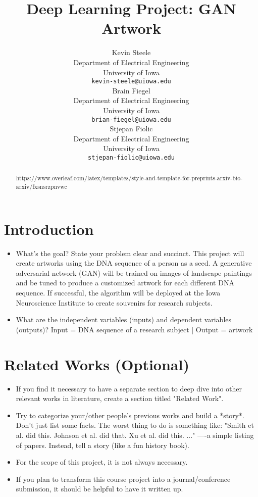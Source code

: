 \documentclass{article}
\title{Deep Learning Project: GAN Artwork}
\author{
	Kevin Steele \\
	Department of Electrical Engineering \\
	University of Iowa\\
	\texttt{kevin-steele@uiowa.edu} \\
	\And
	Brain Fiegel \\
	Department of Electrical Engineering \\
	University of Iowa\\
	\texttt{brian-fiegel@uiowa.edu} \\
	\And
	Stjepan Fiolic \\
	Department of Electrical Engineering \\
	University of Iowa\\
	\texttt{stjepan-fiolic@uiowa.edu} \\
}
\begin{document}
	\maketitle
	
	\begin{abstract}
		https://www.overleaf.com/latex/templates/style-and-template-for-preprints-arxiv-bio-arxiv/fxsnsrzpnvwc

	\end{abstract}
	
	
	
	
	\section{Introduction}
	\begin{itemize}
		\item What's the goal? State your problem clear and succinct. 
		\subitem This project will create artworks using the DNA sequence of a person as a seed. A generative adversarial network (GAN) will be trained on images of landscape paintings and be tuned to produce a customized artwork for each different DNA sequence. If successful, the algorithm will be deployed at the Iowa Neuroscience Institute to create souvenirs for research subjects.  
		\item What are the independent variables (inputs) and dependent variables (outputs)? 
		\subitem Input = DNA sequence of a research subject | Output = artwork

	\end{itemize}

	
	
	\section{Related Works (Optional)}
	\label{sec:headings}
	
	\begin{itemize}
		\item If you find it necessary to have a separate section to deep dive into other relevant works in literature, create a section titled "Related Work".
		\item Try to categorize your/other people's previous works and build a *story*. Don't just list some facts. The worst thing to do is something like: "Smith et al. did this. Johnson et al. did that. Xu et al. did this. ..." ----a simple listing of papers. Instead, tell a story (like a fun history book).
		\item For the scope of this project, it is not always necessary.
		\item If you plan to transform this course project into a journal/conference submission, it should be helpful to have it written up.
	\end{itemize}
	
\end{document}
